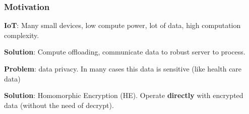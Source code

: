 \documentclass[10pt]{beamer}
\begin{document}
\begin{frame}
    \frametitle{Motivation}

        \textbf{IoT}: Many small devices, low compute power, lot of data, high computation complexity.
    \vspace{-0.3cm}

        \textbf{Solution}: Compute offloading, communicate data to robust server to process.
    \vspace{-0.3cm}

\pause
        \textbf{Problem}: data privacy. In many cases this data is sensitive (like health care data)
    \vspace{-0.3cm}


\pause
          \textbf{Solution}: Homomorphic Encryption (HE). Operate \textbf{directly} with encrypted data (without the need of decrypt).
          \pause
\begin{columns}
\end{columns}
\end{frame}
\end{document}
